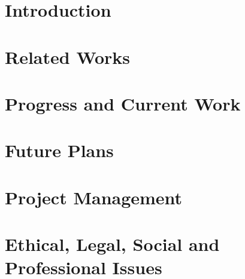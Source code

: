 \documentclass[a4paper,fleqn,10pt]{article}
\begin{document}


\pagestyle{plain}

\section{Introduction}


\section{Related Works}
\label{sec:backgr}


\section{Progress and Current Work}


\section{Future Plans}


\section{Project Management}


\section{Ethical, Legal, Social and Professional Issues}



% 



\clearpage %


\end{document}
